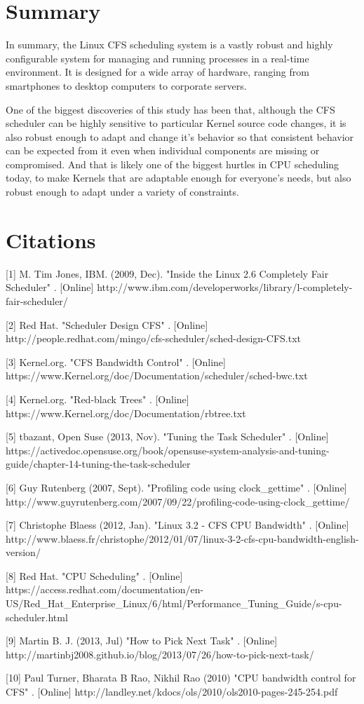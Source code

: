 \section{Summary}

In summary, the Linux CFS scheduling system is a vastly robust and highly configurable system for managing and running processes in a real-time environment. It is designed for a wide array of hardware, ranging from  smartphones to desktop computers to corporate servers.

One of the biggest discoveries of this study has been that, although the CFS scheduler can be highly sensitive to particular Kernel source code changes, it is also robust enough to adapt and change it's behavior so that consistent behavior can be expected from it even when individual components are missing or compromised. And that is likely one of the biggest hurtles in CPU scheduling today, to make Kernels that are adaptable enough for everyone's needs, but also robust enough to adapt under a variety of constraints.


\section{Citations}

[1] M. Tim Jones, IBM. (2009, Dec). "Inside the Linux 2.6 Completely Fair Scheduler" . [Online] http://www.ibm.com/developerworks/library/l-completely-fair-scheduler/

[2] Red Hat. "Scheduler Design CFS" . [Online] http://people.redhat.com/mingo/cfs-scheduler/sched-design-CFS.txt

[3] Kernel.org. "CFS Bandwidth Control" . [Online] https://www.Kernel.org/doc/Documentation/scheduler/sched-bwc.txt

[4] Kernel.org. "Red-black Trees" . [Online] https://www.Kernel.org/doc/Documentation/rbtree.txt

[5] tbazant, Open Suse (2013, Nov). "Tuning the Task Scheduler" . [Online] https://activedoc.opensuse.org/book/opensuse-system-analysis-and-tuning-guide/chapter-14-tuning-the-task-scheduler

[6] Guy Rutenberg (2007, Sept). "Profiling code using clock\_gettime" . [Online] http://www.guyrutenberg.com/2007/09/22/profiling-code-using-clock\_gettime/

[7] Christophe Blaess (2012, Jan). "Linux 3.2 - CFS CPU Bandwidth" . [Online] http://www.blaess.fr/christophe/2012/01/07/linux-3-2-cfs-cpu-bandwidth-english-version/

[8] Red Hat. "CPU Scheduling" . [Online] https://access.redhat.com/documentation/en-US/Red\_Hat\_Enterprise\_Linux/6/html/Performance\_Tuning\_Guide/s-cpu-scheduler.html

[9] Martin B. J. (2013, Jul) "How to Pick Next Task" . [Online] http://martinbj2008.github.io/blog/2013/07/26/how-to-pick-next-task/

[10] Paul Turner, Bharata B Rao, Nikhil Rao (2010) "CPU bandwidth control for CFS" . [Online] http://landley.net/kdocs/ols/2010/ols2010-pages-245-254.pdf